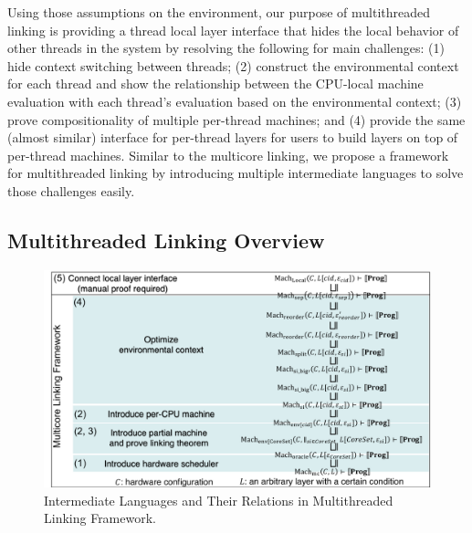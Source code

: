 Using those assumptions on the environment,
our purpose of  multithreaded linking is providing a thread local layer interface that hides 
the local behavior of other threads in the system by resolving the following for 
main challenges:
(1) hide context switching between threads; 
(2) construct the environmental context for each thread and show the relationship between the CPU-local machine evaluation with each thread's evaluation based on the environmental context;
(3) prove compositionality of multiple per-thread machines; and 
(4) provide the same (almost similar) interface for per-thread layers 
for users to build layers on top of per-thread machines. 
Similar to the multicore linking, 
we propose a framework for multithreaded linking by introducing multiple intermediate languages to 
solve those challenges easily.



\subsection{Multithreaded Linking Overview}
\label{chapter:linking:subsec:multithreaded-linking-overview}



\begin{figure}
\begin{center}
\includegraphics[width=\textwidth, page=2]{figs/conlink/concurrent_linking}
\caption{Intermediate Languages and Their Relations in Multithreaded Linking Framework.}
\label{fig:chapter:linking:multithreaded-linking-structure}
\end{center}
\end{figure}

